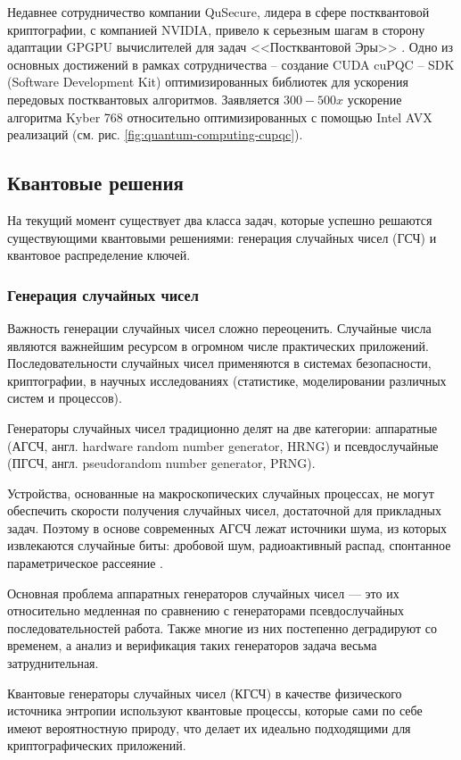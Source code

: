 \documentclass[a4paper,12pt]{article}
\begin{document}
Недавнее сотрудничество компании QuSecure, лидера в сфере постквантовой криптографии, с компанией NVIDIA, привело к серьезным шагам в сторону адаптации GPGPU вычислителей для задач <<Постквантовой Эры>> \cite{cuPQC_Blog}. Одно из основных достижений в рамках сотрудничества -- создание CUDA cuPQC -- SDK (Software Development Kit) оптимизированных библиотек для ускорения передовых постквантовых алгоритмов. Заявляется $300-500x$ ускорение алгоритма Kyber 768 относительно оптимизированных с помощью Intel AVX реализаций (см. рис. \ref{fig:quantum-computing-cupqc}).  

\subsection{Квантовые решения}

На текущий момент существует два класса задач, которые успешно решаются существующими квантовыми решениями: генерация случайных чисел (ГСЧ) и квантовое распределение ключей.

\subsubsection{Генерация случайных чисел}

Важность генерации случайных чисел сложно переоценить. Случайные числа являются важнейшим ресурсом в огромном числе практических приложений. Последовательности случайных чисел применяются в системах безопасности, криптографии, в научных исследованиях (статистике, моделировании различных систем и процессов).

Генераторы случайных чисел традиционно делят на две категории: аппаратные (АГСЧ, англ. hardware random number generator, HRNG) и псевдослучайные (ПГСЧ, англ. pseudorandom number generator, PRNG).

Устройства, основанные на макроскопических случайных процессах, не могут обеспечить скорости получения случайных чисел, достаточной для прикладных задач. Поэтому в основе современных АГСЧ лежат источники шума, из которых извлекаются случайные биты: дробовой шум, радиоактивный распад, спонтанное параметрическое рассеяние \cite{Henk}.

Основная проблема аппаратных генераторов случайных чисел — это их относительно медленная по сравнению с генераторами псевдослучайных последовательностей работа. Также многие из них постепенно деградируют со временем, а анализ и верификация таких генераторов задача весьма затруднительная.

Квантовые генераторы случайных чисел (КГСЧ) в качестве физического источника энтропии используют квантовые процессы, которые сами по себе имеют вероятностную природу, что делает их идеально подходящими для криптографических приложений.
\end{document}
